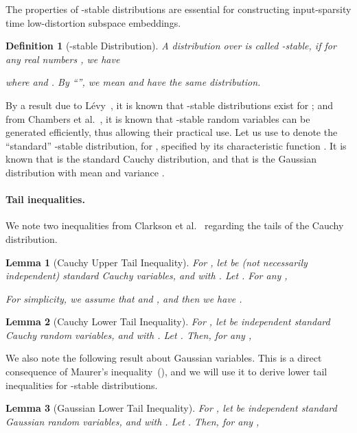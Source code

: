 \documentclass[11pt]{article}
\newtheorem{definition}{Definition}
\newtheorem{lemma}{Lemma}
\begin{document}
The properties of -stable distributions are essential for constructing
input-sparsity time low-distortion  subspace embeddings.

\begin{definition}[-stable Distribution]
  A distribution  over  is called -stable, if for any  real
  numbers , we have
  
  where  and .
  By ``'', we mean  and  have the same distribution.
\end{definition}

\noindent
By a result due to L{\'e}vy~\cite{levy1925calcul}, it is known that -stable
distributions exist for ; and from Chambers et
al.~\cite{chambers1976method}, it is known that -stable random variables can
be generated efficiently, thus allowing their practical use.
Let us use  to denote the ``standard'' -stable distribution, for
, specified by its characteristic function .
It is known that  is the standard Cauchy distribution, and that  is
the Gaussian distribution with mean  and variance .

\paragraph{Tail inequalities.}
We note two inequalities from Clarkson et al.~\cite{CDMMMW13_SODA} regarding the
tails of the Cauchy distribution.

\begin{lemma}[Cauchy Upper Tail Inequality]
  \label{lemma:cauchy_upper}
  For , let  be  (not necessarily independent) standard
  Cauchy variables, and  with .
  Let .
  For any ,
  
  For simplicity, we assume that  and , and then we have
  .
\end{lemma}

\begin{lemma}[Cauchy Lower Tail Inequality]
  \label{lemma:cauchy_lower}
  For , let  be independent standard Cauchy random variables, and
   with . 
  Let . 
  Then, for any ,
  
\end{lemma}

\noindent
We also note the following result about Gaussian variables.
This is a direct consequence of Maurer's inequality~(\cite{maurer2003bound}),
and we will use it to derive lower tail inequalities for -stable
distributions.

\begin{lemma}[Gaussian Lower Tail Inequality]
  \label{lemma:gaussian_lower}
  For , let  be independent standard Gaussian random
  variables, and  with . 
  Let . 
  Then, for any ,
  
\end{lemma}
\end{document}
